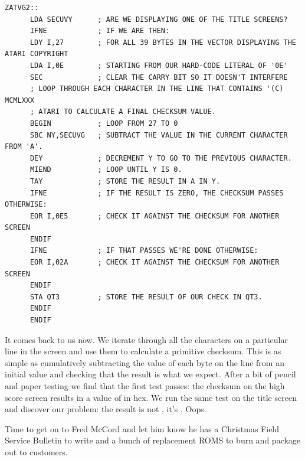 \begin{lstlisting}
ZATVG2::
      LDA SECUVY      ; ARE WE DISPLAYING ONE OF THE TITLE SCREENS?
      IFNE            ; IF WE ARE THEN:
      LDY I,27        ; FOR ALL 39 BYTES IN THE VECTOR DISPLAYING THE ATARI COPYRIGHT
      LDA I,0E        ; STARTING FROM OUR HARD-CODE LITERAL OF '0E'
      SEC             ; CLEAR THE CARRY BIT SO IT DOESN'T INTERFERE
      ; LOOP THROUGH EACH CHARACTER IN THE LINE THAT CONTAINS '(C) MCMLXXX
      ; ATARI TO CALCULATE A FINAL CHECKSUM VALUE.
      BEGIN           ; LOOP FROM 27 TO 0
      SBC NY,SECUVG   ; SUBTRACT THE VALUE IN THE CURRENT CHARACTER FROM 'A'.
      DEY             ; DECREMENT Y TO GO TO THE PREVIOUS CHARACTER.
      MIEND           ; LOOP UNTIL Y IS 0.
      TAY             ; STORE THE RESULT IN A IN Y.
      IFNE            ; IF THE RESULT IS ZERO, THE CHECKSUM PASSES OTHERWISE:
      EOR I,0E5       ; CHECK IT AGAINST THE CHECKSUM FOR ANOTHER SCREEN
      ENDIF           
      IFNE            ; IF THAT PASSES WE'RE DONE OTHERWISE:
      EOR I,02A       ; CHECK IT AGAINST THE CHECKSUM FOR ANOTHER SCREEN
      ENDIF           
      STA QT3         ; STORE THE RESULT OF OUR CHECK IN QT3.
      ENDIF
      ENDIF
\end{lstlisting}

It comes back to us now. We iterate through all the characters on a particular line in the screen and use them to calculate
a primitive checksum. This is as simple as cumulatively subtracting the value of each byte on the line from an initial value
and checking that the result is what we expect. After a bit of pencil and paper testing we find that the first test passes:
the checksum on the high score screen results in a value of  in hex. We run the same test on the title screen
and discover our problem: the result is not , it's . Oops.

Time to get on to Fred McCord and let him know he has a Christmas Field Service Bulletin to write and a bunch of replacement
ROMS to burn and package out to customers.



